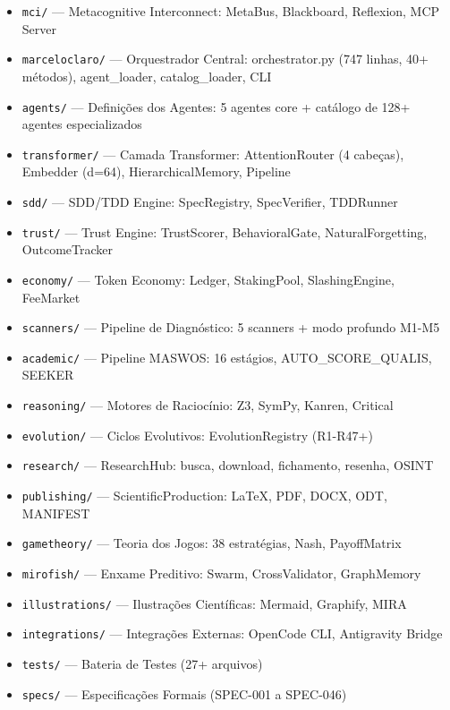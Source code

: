 \begin{itemize}
  \item \texttt{mci/} — Metacognitive Interconnect: MetaBus, Blackboard, Reflexion, MCP Server
  \item \texttt{marceloclaro/} — Orquestrador Central: orchestrator.py (747 linhas, 40+ métodos), agent\_loader, catalog\_loader, CLI
  \item \texttt{agents/} — Definições dos Agentes: 5 agentes core + catálogo de 128+ agentes especializados
  \item \texttt{transformer/} — Camada Transformer: AttentionRouter (4 cabeças), Embedder (d=64), HierarchicalMemory, Pipeline
  \item \texttt{sdd/} — SDD/TDD Engine: SpecRegistry, SpecVerifier, TDDRunner
  \item \texttt{trust/} — Trust Engine: TrustScorer, BehavioralGate, NaturalForgetting, OutcomeTracker
  \item \texttt{economy/} — Token Economy: Ledger, StakingPool, SlashingEngine, FeeMarket
  \item \texttt{scanners/} — Pipeline de Diagnóstico: 5 scanners + modo profundo M1-M5
  \item \texttt{academic/} — Pipeline MASWOS: 16 estágios, AUTO\_SCORE\_QUALIS, SEEKER
  \item \texttt{reasoning/} — Motores de Raciocínio: Z3, SymPy, Kanren, Critical
  \item \texttt{evolution/} — Ciclos Evolutivos: EvolutionRegistry (R1-R47+)
  \item \texttt{research/} — ResearchHub: busca, download, fichamento, resenha, OSINT
  \item \texttt{publishing/} — ScientificProduction: LaTeX, PDF, DOCX, ODT, MANIFEST
  \item \texttt{gametheory/} — Teoria dos Jogos: 38 estratégias, Nash, PayoffMatrix
  \item \texttt{mirofish/} — Enxame Preditivo: Swarm, CrossValidator, GraphMemory
  \item \texttt{illustrations/} — Ilustrações Científicas: Mermaid, Graphify, MIRA
  \item \texttt{integrations/} — Integrações Externas: OpenCode CLI, Antigravity Bridge
  \item \texttt{tests/} — Bateria de Testes (27+ arquivos)
  \item \texttt{specs/} — Especificações Formais (SPEC-001 a SPEC-046)
\end{itemize}

